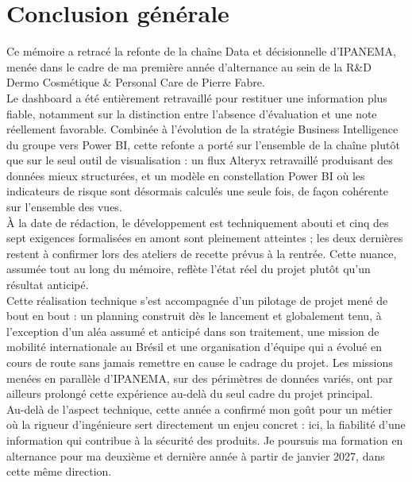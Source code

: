 \chapter*{\textbf{Conclusion générale}}
\label{concl}

Ce mémoire a retracé la refonte de la chaîne Data et décisionnelle d'IPANEMA, 
menée dans le cadre de ma première année d'alternance au sein de la R\&D Dermo
Cosmétique \& Personal Care de Pierre Fabre. \\

Le dashboard a été entièrement retravaillé pour restituer une information plus fiable, 
notamment sur la distinction entre l'absence d'évaluation et une note réellement favorable. 
Combinée à l'évolution de la stratégie Business Intelligence du groupe vers Power BI, cette 
refonte a porté sur l'ensemble de la chaîne plutôt que sur le seul outil de visualisation : un 
flux Alteryx retravaillé produisant des données mieux structurées, et un modèle en 
constellation Power BI où les indicateurs de risque sont désormais calculés une seule fois, 
de façon cohérente sur l'ensemble des vues. \\

À la date de rédaction, le développement est techniquement abouti et cinq des sept 
exigences formalisées en amont sont pleinement atteintes ; les deux dernières restent à 
confirmer lors des ateliers de recette prévus à la rentrée. Cette nuance, assumée tout au 
long du mémoire, reflète l'état réel du projet plutôt qu'un résultat anticipé. \\

Cette réalisation technique s'est accompagnée d'un pilotage de projet mené de bout 
en bout : un planning construit dès le lancement et globalement tenu, à l'exception d'un aléa 
assumé et anticipé dans son traitement, une mission de mobilité internationale au Brésil et 
une organisation d'équipe qui a évolué en cours de route sans jamais remettre en cause le 
cadrage du projet. Les missions menées en parallèle d'IPANEMA, sur des périmètres de 
données variés, ont par ailleurs prolongé cette expérience au-delà du seul cadre du projet 
principal. \\ 
    
Au-delà de l'aspect technique, cette année a confirmé mon goût pour un métier où la 
rigueur d'ingénieure sert directement un enjeu concret : ici, la fiabilité d'une information qui 
contribue à la sécurité des produits. Je poursuis ma formation en alternance pour ma 
deuxième et dernière année à partir de janvier 2027, dans cette même direction. 
